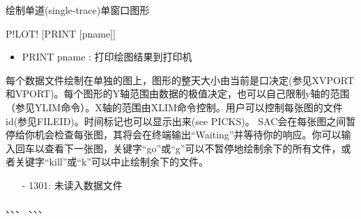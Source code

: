 \label{cmd:plot}

绘制单道(single-trace)单窗口图形

\begin{SACSTX}
P!LOT! [PRINT [pname]]
\end{SACSTX}

\begin{itemize}
\item PRINT pname : 打印绘图结果到打印机
\end{itemize}

每个数据文件绘制在单独的图上，图形的整天大小由当前是口决定(参见XVPORT和VPORT)。每个图形的Y轴范围由数据的极值决定，也可以自己限制y轴的范围（参见YLIM命令）。X轴的范围由XLIM命令控制。用户可以控制每张图的文件id(参见FILEID)。时间标记也可以显示出来(see PICKS)。
SAC会在每张图之间暂停给你机会检查每张图，其将会在终端输出``Waiting''并等待你的响应。你可以输入回车以查看下一张图，关键字``go''或``g''可以不暂停地绘制余下的所有文件，或者关键字``kill''或``k''可以中止绘制余下的文件。

\begin{itemize}
\item[-]1301: 未读入数据文件
\end{itemize}

、、、
、、、
